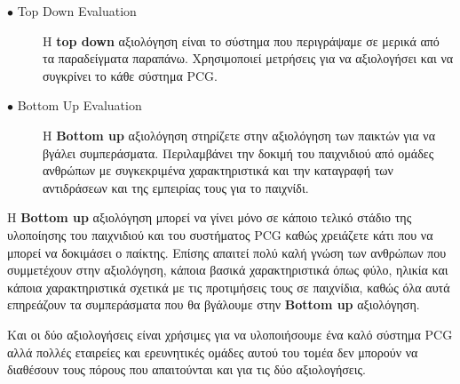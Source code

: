 \begin{description}
  \item[$\bullet$ Top Down Evaluation] Η \textbf{top down} αξιολόγηση είναι το σύστημα που περιγράψαμε σε μερικά από τα παραδείγματα παραπάνω. Χρησιμοποιεί μετρήσεις για να αξιολογήσει και να συγκρίνει το κάθε σύστημα PCG.
  \item[$\bullet$ Bottom Up Evaluation] Η \textbf{Bottom up} αξιολόγηση στηρίζετε στην αξιολόγηση των παικτών για να βγάλει συμπεράσματα. Περιλαμβάνει την δοκιμή του παιχνιδιού από ομάδες ανθρώπων με συγκεκριμένα χαρακτηριστικά και την καταγραφή των αντιδράσεων και της εμπειρίας τους για το παιχνίδι.
\end{description}
\par
Η \textbf{Bottom up} αξιολόγηση μπορεί να γίνει μόνο σε κάποιο τελικό στάδιο της υλοποίησης του παιχνιδιού και του συστήματος PCG καθώς χρειάζετε κάτι που να μπορεί να δοκιμάσει ο παίκτης. Επίσης απαιτεί πολύ καλή γνώση των ανθρώπων που συμμετέχουν στην αξιολόγηση, κάποια βασικά χαρακτηριστικά όπως φύλο, ηλικία και κάποια χαρακτηριστικά σχετικά με τις προτιμήσεις τους σε παιχνίδια, καθώς όλα αυτά επηρεάζουν τα συμπεράσματα που θα βγάλουμε στην \textbf{Bottom up} αξιολόγηση.
\par
Και οι δύο αξιολογήσεις είναι χρήσιμες για να υλοποιήσουμε ένα καλό σύστημα PCG αλλά πολλές εταιρείες και ερευνητικές ομάδες αυτού του τομέα δεν μπορούν να διαθέσουν τους πόρους που απαιτούνται και για τις δύο αξιολογήσεις.






